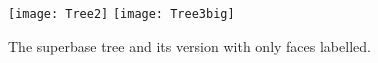 \documentclass[11pt,reqno]{amsart}
\begin{document}
%		
		
\begin{figure}[h]
\begin{center}
 \texttt{[image: Tree2]}  \hspace{8pt}  \texttt{[image: Tree3big]}
\caption{\small The superbase tree and its version with only faces labelled.}
\end{center}
\end{figure}

%		
%	
	
\end{document}
